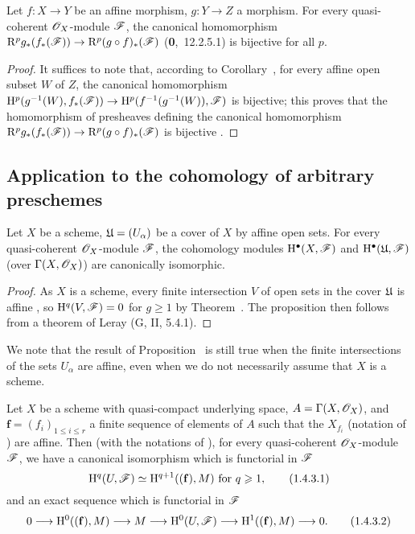 \begin{cor}[1.3.4]
\label{3.1.3.4}
Let $f:X\to Y$ be an affine morphism, $g:Y\to Z$ a morphism.
For every quasi-coherent $\mathscr{O}_X$-module $\mathscr{F}$, the canonical homomorphism $\RR^p g_*(f_*(\sh{F}))\to\RR^p(g\circ f)_*(\sh{F})$ (\textbf{0},~12.2.5.1) is bijective for all $p$.
\end{cor}

\begin{proof}
\label{proof-3.1.3.4}
It suffices to note that, according to Corollary~, for every affine open subset $W$ of $Z$, the canonical homomorphism $\HH^p(g^{-1}(W),f_*(\sh{F}))\to\HH^p(f^{-1}(g^{-1}(W)),\sh{F})$ is bijective; this proves that the homomorphism of presheaves defining the canonical homomorphism $\RR^p g_*(f_*(\sh{F}))\to\RR^p(g\circ f)_*(\sh{F})$ is bijective .
\end{proof}

\subsection{Application to the cohomology of arbitrary preschemes}
\label{subsection:application-cohomology-preschemes}

\begin{prop}[1.4.1]
\label{3.1.4.1}
Let $X$ be a scheme, $\mathfrak{U}=(U_\alpha)$ be a cover of $X$ by affine open sets.
For every quasi-coherent $\mathscr{O}_X$-module $\mathscr{F}$, the cohomology modules $\mathrm{H}^\bullet(X,\mathscr{F})$ and $\mathrm{H}^\bullet(\mathfrak{U},\mathscr{F})$ (over $\Gamma(X,\mathscr{O}_X)$) are canonically isomorphic.
\end{prop}

\begin{proof}
\label{proof-3.1.4.1}
As $X$ is a scheme, every finite intersection $V$ of open sets in the cover $\mathfrak{U}$ is affine , so $\mathrm{H}^q(V,\mathscr{F})=0$ for $g\geq 1$ by Theorem~.
The proposition then follows from a theorem of Leray (G, II, 5.4.1).
\end{proof}

\begin{rmk}[1.4.2]
\label{3.1.4.2}
We note that the result of Proposition~ is still true when the finite intersections of the sets $U_\alpha$ are affine, even when we do not necessarily assume that $X$ is a scheme.
\end{rmk}

\begin{cor}[1.4.3]
\label{3.1.4.3}
Let $X$ be a scheme with quasi-compact underlying space, $A=\Gamma(X,\mathscr{O}_X)$, and $\mathbf{f}=(f_i)_{1\leq i\leq r}$ a finite sequence of elements of $A$ such that the $X_{f_i}$ (notation of ) are affine.
Then (with the notations of ), for every quasi-coherent $\mathscr{O}_X$-module $\mathscr{F}$, we have a canonical isomorphism which is functorial in $\mathscr{F}$
\[
  \mathrm{H}^q(U,\mathscr{F})\simeq\mathrm{H}^{q+1}((\mathbf{f}),M)\text{ for }q\geqslant 1,
  \tag{1.4.3.1}
\]
and an exact sequence which is functorial in $\mathscr{F}$
\[
  0\to\HH^0((\mathbf{f}),M)\to M\to\HH^0(U,\sh{F})\to\HH^1((\mathbf{f}),M)\to 0.
  \tag{1.4.3.2}
\]
\end{cor}

